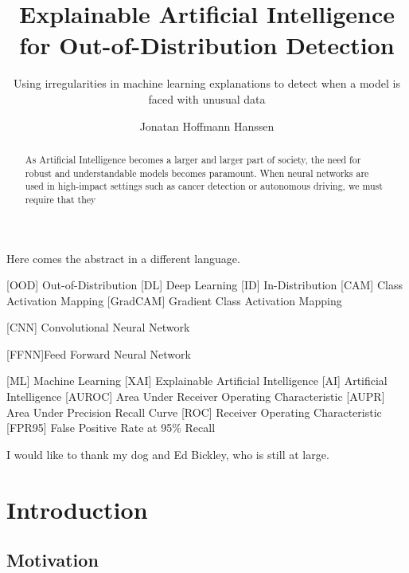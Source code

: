 \documentclass[UKenglish]{uiomasterthesis} %
\title{Explainable Artificial Intelligence for Out-of-Distribution Detection}
\subtitle{Using irregularities in machine learning explanations to detect when a model is faced with unusual data}
\author{Jonatan Hoffmann Hanssen}
\theoremstyle{definition}
\begin{document}
\uiomasterfp[dept={Department of Informatics},
program={Robotics and Intelligent Systems},
supervisors={Hugo Lewi Hammer \and Kyrre Harald Glette},
long]

\frontmatter{}
\begin{abstract}
As Artificial Intelligence becomes a larger and larger part of society, the need for robust and understandable models becomes paramount. When neural networks are used in high-impact settings such as cancer detection or autonomous driving, we must require that they 
\end{abstract}

\begin{xabstract}[Sammendrag]
Here comes the abstract in a different language.
\end{xabstract}

\tableofcontents{}
\listoffigures{}
\listoftables{}

\begin{acronym}[ICANN]
       [OOD]   {Out-of-Distribution}
       [DL]   {Deep Learning}
     [ID] {In-Distribution}
     [CAM] {Class Activation Mapping}
     [GradCAM] {Gradient Class Activation Mapping}

       [CNN]   {Convolutional Neural Network}

    [FFNN]{Feed Forward Neural Network}

       [ML]   {Machine Learning}
       [XAI]   {Explainable Artificial Intelligence}
       [AI]   {Artificial Intelligence}
       [AUROC]   {Area Under Receiver Operating Characteristic}
       [AUPR]   {Area Under Precision Recall Curve}
       [ROC]   {Receiver Operating Characteristic}
       [FPR95]   {False Positive Rate at 95\% Recall}
\end{acronym}

\begin{preface}
I would like to thank my dog and Ed Bickley, who is still at large.
\end{preface}

\mainmatter{}



\chapter{Introduction}

\section{Motivation}
\end{document}
